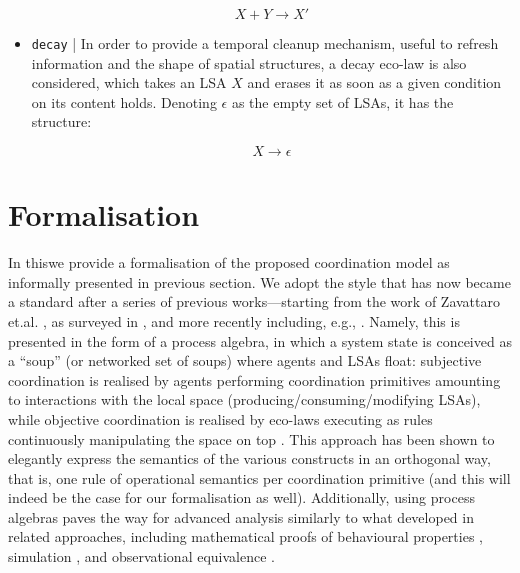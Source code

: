 \documentclass[12pt,a4paper,twoside,openright]{book}
\begin{document}
\begin{itemize}
 \[X + Y \rightarrow X'\]
 
 \item \texttt{decay} | In order to provide a temporal cleanup mechanism, useful to refresh information and the shape of spatial structures, a decay eco-law is also considered, which takes an LSA $X$ and erases it as soon as a given condition on its content holds. Denoting $\epsilon$ as the empty set of LSAs, it has the structure:
 
 \[X \rightarrow \epsilon\]
 
\end{itemize}

\section{Formalisation}

In this\levelText{}we provide a formalisation of the proposed coordination model as informally presented in previous section. We adopt the style that has now became a standard after a series of previous works---starting from the work of Zavattaro et.al. \cite{zavattaro}, as surveyed in \cite{VO-FI2006}, and more recently including, e.g., \cite{VPB-COORD2012,TerepetaNN12,BortolussiLM13,MassinkL12,LaneseBF13}.
%
Namely, this is presented in the form of a process algebra, in which a system state is conceived as a ``soup'' (or networked set of soups) where agents and LSAs float: subjective coordination is realised by agents performing coordination primitives amounting to interactions with the local space (producing/consuming/modifying LSAs), while objective coordination is realised by eco-laws executing as rules continuously manipulating the space on top \cite{biochemicalTupleSpaces,tucson-aamas99,RicciOD02}.
%
This approach has been shown to elegantly express the semantics of the various constructs in an orthogonal way, that is, one rule of operational semantics per coordination primitive (and this will indeed be the case for our formalisation as well). 
%
Additionally, using process algebras paves the way for advanced analysis similarly to what developed in related approaches, including mathematical proofs of behavioural properties \cite{V-SCW2013}, simulation \cite{sapereecolaws-sac2012,DeNicolaLM05}, and observational equivalence \cite{LaneseBF13}.
%
\end{document}
